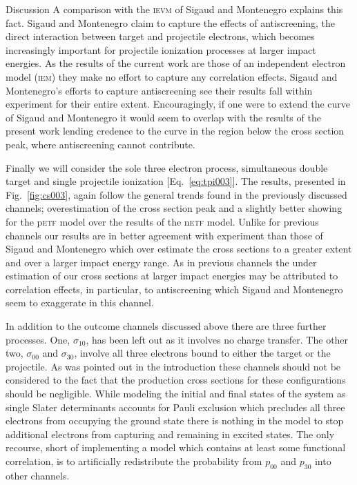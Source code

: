 \documentclass[aps, pra, reprint, groupedaddress, amsfonts, longbibliography,
               amsmath, amssymb, showpacs, nofootinbib]{revtex4-1}
\begin{document}
\begin{section}{Discussion \label{sec:disc}}
   A comparison with the \textsc{ievm} of Sigaud and Montenegro explains this fact. Sigaud and
   Montenegro claim to capture the effects of antiscreening, the direct interaction between target and
   projectile electrons, which becomes increasingly important for projectile ionization processes at
   larger impact energies. As the results of the current work are those of an independent electron model
   (\textsc{iem}) they make no effort to capture any correlation effects. Sigaud and Montenegro's
   efforts to capture antiscreening see their results fall within experiment for their entire extent.
   Encouragingly, if one were to extend the curve of Sigaud and Montenegro it would seem to overlap with
   the results of the present work lending credence to the curve in the region below the cross section
   peak, where antiscreening cannot contribute.

   Finally we will consider the sole three electron process, simultaneous double target and single
   projectile ionization [Eq.~\eqref{eq:tpi003}]. The results, presented in Fig.~\ref{fig:cs003}, again
   follow the general trends found in the previously discussed channels; overestimation of the cross
   section peak and a slightly better showing for the p\textsc{etf} model over the results of the
   n\textsc{etf} model. Unlike for previous channels our results are in better agreement with experiment
   than those of Sigaud and Montenegro which over estimate the cross sections to a greater extent and
   over a larger impact energy range. As in previous channels the under estimation of our cross sections
   at larger impact energies may be attributed to correlation effects, in particular, to antiscreening
   which  Sigaud and Montenegro seem to exaggerate in this channel.

   In addition to the outcome channels discussed above there are three further processes. One,
   $\sigma_{10}$, has been left out as it involves no charge transfer. The other two, $\sigma_{00}$ and
   $\sigma_{30}$, involve all three electrons bound to either the target or the projectile. As was
   pointed out in the introduction these channels should not be considered to the fact that the
   production cross sections for these configurations should be negligible. While modeling the initial
   and final states of the system as single Slater determinants accounts for Pauli exclusion which
   precludes all three electrons from occupying the ground state there is nothing in the model to stop
   additional electrons from capturing and remaining in excited states. The only recourse, short of
   implementing a model which contains at least some functional correlation, is to artificially
   redistribute the probability from $p_{00}$ and $p_{30}$ into other channels.


\end{section}
\end{document}
